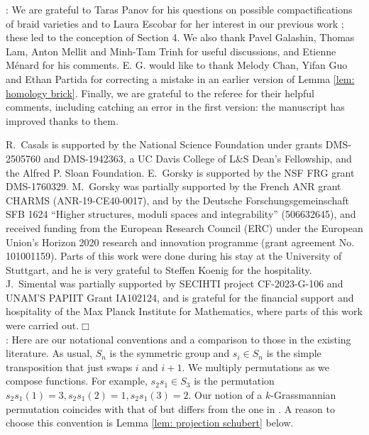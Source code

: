 \documentclass[10pt]{amsart}
\theoremstyle{plain}
\theoremstyle{definition}
\theoremstyle{remark}
\numberwithin{equation}{section}
\begin{document}
: We are grateful to Taras Panov for his questions on possible compactifications of braid varieties and to Laura Escobar for her interest in our previous work \cite{CGGS}; these led to the conception of Section 4. We also thank Pavel Galashin, Thomas Lam, Anton Mellit and Minh-Tam Trinh for useful discussions, and Etienne M\'enard for his comments. E. G. would like to thank Melody Chan, Yifan Guo and Ethan Partida for correcting a mistake in an earlier version of Lemma \ref{lem: homology brick}. Finally, we are grateful to the referee for their helpful comments, including catching an error in the first version: the manuscript has improved thanks to them.

R.~Casals is supported by the National Science Foundation under grants DMS-2505760 and DMS-1942363, a UC Davis College of L\&S Dean's Fellowship, and the Alfred P. Sloan Foundation.
E.~Gorsky is supported by the NSF FRG grant DMS-1760329.
M.~Gorsky was partially supported by the French ANR grant CHARMS (ANR-19-CE40-0017), and by the Deutsche Forschungsgemeinschaft SFB 1624 ``Higher structures, moduli spaces and integrability'' (506632645), and received funding from the European Research Council (ERC) under the European Union’s Horizon 2020 research and innovation programme (grant agreement No. 101001159). Parts of this work were done during his stay at the University of Stuttgart, and he is very grateful to Steffen Koenig for the hospitality. J.~Simental was partially supported by SECIHTI project CF-2023-G-106 and UNAM'S PAPIIT Grant IA102124, and is grateful for the financial support and hospitality of the Max Planck Institute for Mathematics, where parts of this work were carried out.\hfill$\Box$\\

: Here are our notational conventions and a comparison to those in the existing literature. As usual, $S_n$ is the symmetric group and $s_i \in S_n$ is the simple transposition that just swaps $i$ and $i+1$. We multiply permutations as we compose functions. For example, $s_2s_1\in S_3$ is the permutation $s_2s_1(1) = 3, s_2s_1(2) = 1, s_2s_1(3) = 2$. Our notion of a $k$-Grassmannian permutation coincides with that of \cite{KLS} but differs from the one in \cite{GL}. A reason to choose this convention is Lemma \ref{lem: projection schubert} below.
\end{document}

